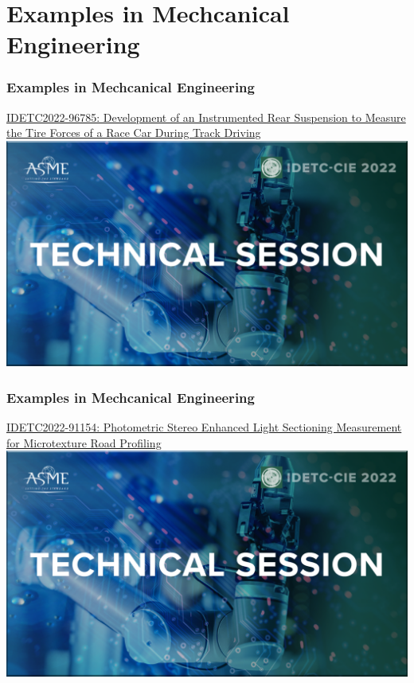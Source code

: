 \documentclass[fleqn]{beamer} %
\newcommand{\sectiontitleV}{Examples in Mechcanical Engineering}
\begin{document}
\section{\sectiontitleV}

\begin{frame}[label=sectionV]
\frametitle{\sectiontitleV}
\href{https://events-platform.asmeconferences.org/event/idetc-cie-2022/planning/UGxhbm5pbmdfOTcxMjI2}{IDETC2022-96785: Development of an Instrumented Rear Suspension to Measure the Tire Forces of a Race Car During Track Driving}\vspace{5mm}\\

\includegraphics[scale=0.125]{IDETC_technical_session.png}

\end{frame}

\begin{frame}[label=sectionV]
\frametitle{\sectiontitleV}

\href{https://events-platform.asmeconferences.org/event/idetc-cie-2022/planning/UGxhbm5pbmdfOTcxMzIx}{IDETC2022-91154: Photometric Stereo Enhanced Light Sectioning Measurement for Microtexture Road Profiling}\vspace{5mm}\\

\includegraphics[scale=0.125]{IDETC_technical_session.png}
 
\end{frame}
\end{document}
